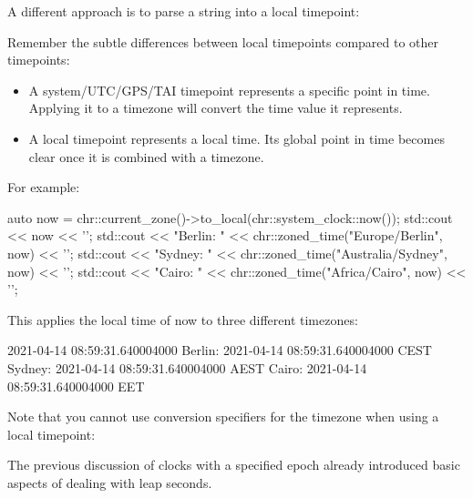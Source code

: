A different approach is to parse a string into a local timepoint:


Remember the subtle differences between local timepoints compared to other timepoints:

\begin{itemize}
\item 
A system/UTC/GPS/TAI timepoint represents a specific point in time. Applying it to a timezone will convert the time value it represents.

\item 
A local timepoint represents a local time. Its global point in time becomes clear once it is combined with a timezone.
\end{itemize}

For example:

\begin{cpp}
auto now = chr::current_zone()->to_local(chr::system_clock::now());
std::cout << now << '\n';
std::cout << "Berlin: " << chr::zoned_time("Europe/Berlin", now) << '\n';
std::cout << "Sydney: " << chr::zoned_time("Australia/Sydney", now) << '\n';
std::cout << "Cairo: " << chr::zoned_time("Africa/Cairo", now) << '\n';
\end{cpp}

This applies the local time of now to three different timezones:

\begin{shell}
2021-04-14 08:59:31.640004000
Berlin: 2021-04-14 08:59:31.640004000 CEST
Sydney: 2021-04-14 08:59:31.640004000 AEST
Cairo:  2021-04-14 08:59:31.640004000 EET
\end{shell}

Note that you cannot use conversion specifiers for the timezone when using a local timepoint:




The previous discussion of clocks with a specified epoch already introduced basic aspects of dealing with leap seconds.

